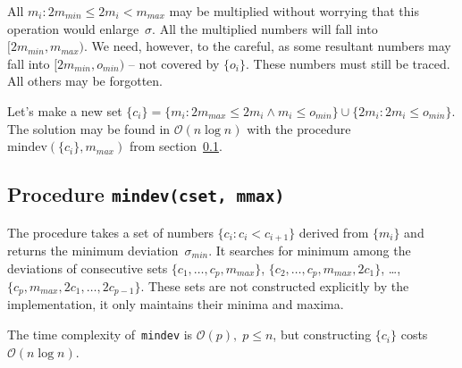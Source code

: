 \documentclass[paper=a4,parskip=half,DIV=12]{leetcode}
\begin{document}
All $m_i: 2 m_{min} \le 2 m_i < m_{max}$ may be multiplied without worrying
that this operation would enlarge~$\sigma$. All the multiplied numbers will
fall into $[2 m_{min}, m_{max})$. We need, however, to the careful, as some
resultant numbers may fall into $[2 m_{min}, o_{min})$ -- not covered by
$\{o_i\}$. These numbers must still be traced. All others may be forgotten.

Let's make a new set $\{ c_i \} = \{ m_i: 2 m_{max} \le 2 m_i \wedge m_i \le o_{min} \}
\cup \{ 2 m_i: 2 m_i \le o_{min} \}$. The solution may be found in
$\mathcal{O}(n \log n)$ with the procedure $\mathrm{mindev}(\{ c_i \}, m_{max})$
from section~\ref{sec:WTM0T}.

\subsection{Procedure \texttt{mindev(cset, mmax)}}
\label{sec:WTM0T}

The procedure takes a set of numbers $\{ c_i: c_i < c_{i+1} \}$ derived from
$\{ m_i \}$ and returns the minimum deviation~$\sigma_{min}$. It searches for
minimum among the deviations of consecutive sets
$\{ c_1, \dots, c_p, m_{max} \}$, $\{ c_2, \dots, c_p, m_{max}, 2 c_1\}$,
\dots, $\{ c_p, m_{max}, 2 c_1, \dots, 2 c_{p-1} \}$. These sets are not
constructed explicitly by the implementation, it only maintains their minima
and maxima.

The time complexity of~\texttt{mindev} is $\mathcal{O}(p),\; p \le n$, but
constructing $\{ c_i \}$ costs $\mathcal{O}(n \log n)$.



\end{document}
